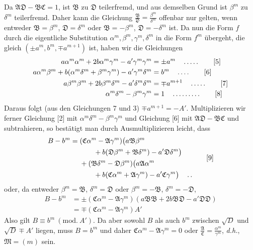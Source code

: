 Da $\mathfrak{A}\mathfrak{D}-\mathfrak{B}\mathfrak{C}=1$, ist $\mathfrak{B}$ zu $\mathfrak{D}$ teilerfremd, und aus demselben Grund ist $\beta^m$ zu $\delta^m$ teilerfremd. Daher kann die Gleichung $\frac{\mathfrak{B}}{\mathfrak{D}}=\frac{\beta^m}{\delta^m}$ offenbar nur gelten, wenn entweder $\mathfrak{B}=\beta^m$, $\mathfrak{D}=\delta^m$ oder $\mathfrak{B}=-\beta^m$, $\mathfrak{D}=-\delta^m$ ist. Da nun die Form $f$ durch die eigentliche Substitution $\alpha^m,\beta^m,\gamma^m,\delta^m$ in die Form $f^m$ übergeht, die gleich $(\pm a^m,b^m,\mp a^{m+1})$ ist, haben wir die Gleichungen
\begin{align*}
a\alpha^m\alpha^m+2b\alpha^m\gamma^m-a'\gamma^m\gamma^m&=\pm a^m \quad \mathinner{\ldotp\ldotp\ldotp\ldotp\ldotp} \tag*{[5]}\\
a\alpha^m\beta^m+b(\alpha^m\delta^m+\beta^m\gamma^m)-a'\gamma^m\delta^m&=b^m \quad \mathinner{\ldotp\ldotp\ldotp\ldotp} \tag*{[6]}\\
a\beta^m\beta^m+2b\beta^m\delta^m-a'\delta^m\delta^m&=\mp a^{m+1} \quad \mathinner{\ldotp\ldotp\ldotp\ldotp\ldotp} \tag*{[7]}\\
\alpha^m\delta^m-\beta^m\gamma^m&=1 \quad \mathinner{\ldotp\ldotp\ldotp\ldotp\ldotp\ldotp\ldotp\ldotp\ldotp} \tag*{[8]}
\end{align*}
Daraus folgt (aus den Gleichungen 7 und 3) $\mp a^{m+1}=-A'$. Multiplizieren wir ferner Gleichung [2] mit $\alpha^m\delta^m-\beta^m\gamma^m$ und Gleichung [6] mit $\mathfrak{A}\mathfrak{D}-\mathfrak{B}\mathfrak{C}$ und subtrahieren, so bestätigt man durch Ausmultiplizieren leicht, dass
\begin{equation*}
\begin{aligned}
B-b^m={}&(\mathfrak{C}\alpha^m-\mathfrak{A}\gamma^m)\bigl(a\mathfrak{B}\beta^m\\
&\qquad+b(\mathfrak{D}\beta^m+\mathfrak{B}\delta^m)-a'\mathfrak{D}\delta^m\bigr)\\
&+(\mathfrak{B}\delta^m-\mathfrak{D}\beta^m)\bigl(a\mathfrak{A}\alpha^m\\
&\qquad+b(\mathfrak{C}\alpha^m+\mathfrak{A}\gamma^m)-a'\mathfrak{C}\gamma^m\bigr)
\quad \mathinner{\ldotp\ldotp}
\end{aligned}
\tag*{[9]}
\end{equation*}
oder, da entweder $\beta^m=\mathfrak{B}$, $\delta^m=\mathfrak{D}$ oder $\beta^m=-\mathfrak{B}$, $\delta^m=-\mathfrak{D}$,
\[
\begin{aligned}
B-b^m&=\pm(\mathfrak{C}\alpha^m-\mathfrak{A}\gamma^m)(a\mathfrak{B}\mathfrak{B}+2b\mathfrak{B}\mathfrak{D}-a'\mathfrak{D}\mathfrak{D})\\
&=\mp(\mathfrak{C}\alpha^m-\mathfrak{A}\gamma^m)A'
\end{aligned}
\]
Also gilt $B\equiv b^m\ (\mathrm{mod.}\ A')$. Da aber sowohl $B$ als auch $b^m$ zwischen $\surd D$ und $\surd D\mp A'$ liegen, muss $B=b^m$ und daher $\mathfrak{C}\alpha^m-\mathfrak{A}\gamma^m=0$ oder $\frac{\mathfrak{A}}{\mathfrak{C}}=\frac{\alpha^m}{\gamma^m}$, \textit{d.h.}, $\mathfrak{M}=(m)$ sein.

